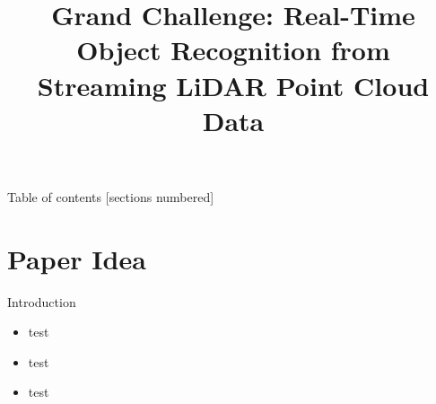 \documentclass[9pt]{beamer}
\title[Real-Time Object Recognition from Streaming LiDAR Point Cloud Data]{Grand Challenge: Real-Time Object Recognition from Streaming LiDAR Point Cloud Data}
\begin{document}







\maketitle






\begin{frame}{Table of contents}
 [sections numbered]
   \tableofcontents[hideallsubsections]
 
 
\end{frame}






\section{Paper Idea}







\begin{frame}[fragile]{Introduction}

\begin{itemize}
  \item test    
  \item test    
  \item test    
\end{itemize}
\end{frame}
\end{document}
